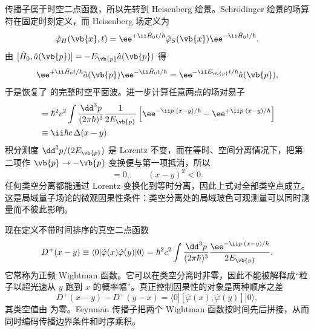 传播子属于时空二点函数，所以先转到 Heisenberg 绘景。Schr\"odinger 绘景的场算符在固定时刻定义，而 Heisenberg 场定义为
\begin{equation*}
 \hat\varphi_H(\vb{x},t)
 =\ee^{+\ii\hat H_0t/\hbar}\hat\varphi_S(\vb{x})
 \ee^{-\ii\hat H_0t/\hbar}.
\end{equation*}
由 $[\hat H_0,\hat a(\vb{p})]=-E_{\vb{p}}\hat a(\vb{p})$ 得
\begin{equation*}
 \ee^{+\ii\hat H_0t/\hbar}\hat a(\vb{p})\ee^{-\ii\hat H_0t/\hbar}
 =\ee^{-\ii E_{\vb{p}}t/\hbar}\hat a(\vb{p}),
\end{equation*}
于是恢复了  的完整时空平面波。进一步计算任意两点的场对易子
\begin{align}
 [\hat\varphi(x),\hat\varphi(y)]
 &=\hbar^2c^2\int\frac{\dd^3 p}{(2\pi\hbar)^3}
 \frac{1}{2E_{\vb{p}}}
 \left[\ee^{-\ii p\cdot(x-y)/\hbar}-\ee^{+\ii p\cdot(x-y)/\hbar}\right]\\
 &\equiv \ii\hbar c\,\Delta(x-y).
 \label{eq:pauli-jordan-r3}
\end{align}
积分测度 $\dd^3 p/(2E_{\vb{p}})$ 是 Lorentz 不变，而在等时、空间分离情况下，把第二项作 $\vb{p}\to-\vb{p}$ 变换便与第一项抵消，所以
\begin{equation}
 [\hat\varphi(x),\hat\varphi(y)]=0,
 \qquad (x-y)^2<0.
 \label{eq:microcausality-scalar-r3}
\end{equation}
任何类空分离都能通过 Lorentz 变换化到等时分离，因此上式对全部类空点成立。这是局域量子场论的微观因果性条件：类空分离处的局域玻色可观测量可以同时测量而不彼此影响。

现在定义不带时间排序的真空二点函数
\begin{equation}
 D^+(x-y)\equiv
 \langle0|\hat\varphi(x)\hat\varphi(y)|0\rangle
 =\hbar^2c^2\int\frac{\dd^3 p}{(2\pi\hbar)^3}
 \frac{\ee^{-\ii p\cdot(x-y)/\hbar}}{2E_{\vb{p}}}.
 \label{eq:wightman-plus-r3}
\end{equation}
它常称为正频 Wightman 函数。它可以在类空分离时非零，因此不能被解释成“粒子以超光速从 $y$ 跑到 $x$ 的概率幅”。真正控制因果性的对象是两种顺序之差
\begin{equation*}
 D^+(x-y)-D^+(y-x)
 =\langle0|[\hat\varphi(x),\hat\varphi(y)]|0\rangle,
\end{equation*}
其类空值由  为零。Feynman 传播子把两个 Wightman 函数按时间先后拼接，从而同时编码传播边界条件和时序乘积。


